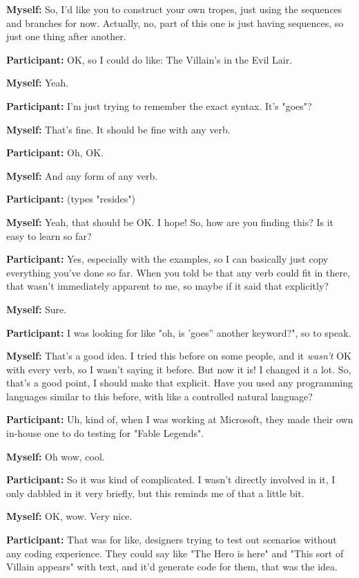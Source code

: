 \documentclass[11pt]{report}
\newcommand{\llabel}[1]{\hypertarget{llineno:#1}{\linelabel{#1}}}
\begin{document}
\begin{linenumbers}
\textbf{Myself:} So, I'd like you to construct your own tropes, just using the sequences and branches for now. Actually, no, part of this one is just having sequences, so just one thing after another.

\textbf{Participant:} OK, so I could do like: The Villain's in the Evil
Lair.\llabel{lne:feature2a}

\textbf{Myself:} Yeah.

\textbf{Participant:} I'm just trying to remember the exact syntax. It's
"goes"?\llabel{lne:syntax2a}

\textbf{Myself:} That's fine. It should be fine with any verb.

\textbf{Participant:} Oh, OK.

\textbf{Myself:} And any form of any verb.

\textbf{Participant:} (types "resides")

\textbf{Myself:} Yeah, that should be OK. I hope! So, how are you finding this? Is it easy to learn so far?

\textbf{Participant:} Yes, especially with the examples, so I can basically just copy everything you've done so far. When you told be that any verb could fit in there, that wasn't immediately apparent to me, so maybe if it said that explicitly?

\textbf{Myself:} Sure.

\textbf{Participant:} I was looking for like "oh, is 'goes'' another keyword?", so to speak.

\textbf{Myself:} That's a good idea. I tried this before on some people, and it \emph{wasn't} OK with every verb, so I wasn't saying it before. But now it is! I changed it a lot. So, that's a good point, I should make that explicit. Have you used any programming languages similar to this before, with like a controlled natural language?

\textbf{Participant:} Uh, kind of, when I was working at Microsoft, they made their own in-house one to do testing for "Fable Legends".

\textbf{Myself:} Oh wow, cool.

\textbf{Participant:} So it was kind of complicated. I wasn't directly involved in it, I only dabbled in it very briefly, but this reminds me of that a little bit.

\textbf{Myself:} OK, wow. Very nice.

\textbf{Participant:} That was for like, designers trying to test out scenarios without any coding experience. They could say like "The Hero is here" and "This sort of Villain appears" with text, and it'd generate code for them, that was the idea.


\end{linenumbers}
\end{document}
